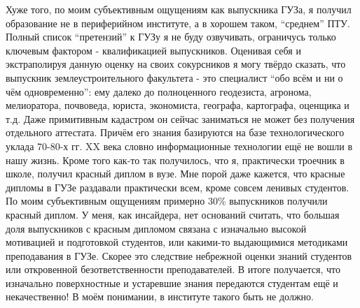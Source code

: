 \begin{drama}
Хуже того, по моим субъективным ощущениям как выпускника ГУЗа, я получил образование не в периферийном институте, а в хорошем таком, “среднем” ПТУ. Полный список “претензий” к ГУЗу я не буду озвучивать, ограничусь только ключевым фактором - квалификацией выпускников. Оценивая себя и экстраполируя данную оценку на своих сокурсников я могу твёрдо сказать, что выпускник землеустроительного факультета - это специалист “обо всём и ни о чём одновременно”: ему далеко до полноценного геодезиста, агронома, мелиоратора, почвоведа, юриста, экономиста, географа, картографа, оценщика и т.д. Даже примитивным кадастром он сейчас заниматься не может без получения отдельного аттестата. Причём его знания базируются на базе технологического уклада 70-80-х гг. XX века словно информационные технологии ещё не вошли в нашу жизнь.  Кроме того как-то так получилось, что я, практически троечник в школе, получил красный диплом в вузе. Мне порой даже кажется, что красные дипломы в ГУЗе раздавали практически всем, кроме совсем ленивых студентов. По моим субъективным ощущениям примерно 30\% выпускников получили красный диплом. У меня, как инсайдера, нет оснований считать, что большая доля выпускников с красным дипломом связана с изначально высокой мотивацией и подготовкой студентов, или какими-то выдающимися методиками преподавания в ГУЗе. Скорее это следствие небрежной оценки знаний студентов или откровенной безответственности преподавателей. В итоге получается, что изначально поверхностные и устаревшие знания передаются студентам ещё и некачественно! В моём понимании, в институте такого быть не должно. 


\end{drama}
